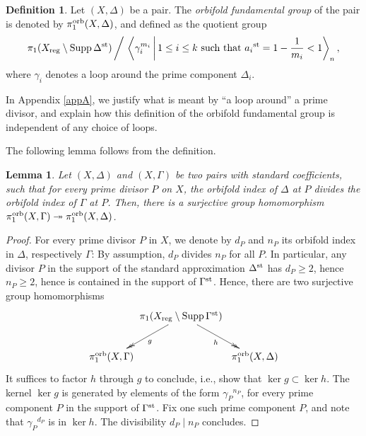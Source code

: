 \documentclass{amsart}
\newtheorem{lemma}[theorem]{Lemma}
\theoremstyle{definition}
\newtheorem{definition}[theorem]{Definition}
\theoremstyle{remark}
\numberwithin{equation}{section}
\begin{document}
\begin{definition}
Let $(X,\Delta)$ be a pair.
The {\em orbifold fundamental group} of the pair is denoted by $\pi_1^{\rm orb}(X,\Delta)$, and defined as the quotient group
\[
\pi_1(X_{\rm reg}\setminus {\rm Supp}\,\Delta^{\rm st})\,\biggr/\,\left\langle \gamma_i^{m_i} \,\biggr\vert\, 1\le i\le k \mbox{ such that } {a_i}^{\rm st} = 1-\frac{1}{m_i} < 1\right\rangle_n, 
\]
where $\gamma_i$ denotes a loop around the prime component $\Delta_i$.
\end{definition}

In Appendix \ref{appA}, we justify what is meant by ``a loop around'' a prime divisor, and explain how this definition of the orbifold fundamental group is independent of any choice of loops.


The following lemma follows from the definition.

\begin{lemma}\label{lem:fun-group-increasing-coeff}
Let $(X,\Delta)$ and $(X,\Gamma)$ be two pairs with standard coefficients, such that
for every prime divisor $P$ on $X$, the orbifold index of $\Delta$ at $P$
divides the orbifold index of $\Gamma$ at $P$.
Then, there is a surjective group homomorphism $\pi_1^{\rm orb}(X,\Gamma)\twoheadrightarrow \pi_1^{\rm orb}(X,\Delta)$.
\end{lemma}

\begin{proof}
For every prime divisor $P$ in $X$, we denote by $d_P$ and $n_P$ its orbifold index in $\Delta$, respectively $\Gamma$: By assumption, $d_P$ divides $n_P$ for all $P$. In particular, any divisor $P$ in the support of the standard approximation $\Delta^{\rm st}$ has $d_P \ge 2$, hence $n_P\ge 2$, hence is contained in the support of $\Gamma^{\rm st}$.
Hence, there are two surjective group homomorphisms
\[\xymatrixcolsep{0mm}
\xymatrix{
& \pi_1(X_{\rm reg}\setminus {\rm Supp}\,\Gamma^{\rm st}) \ar@{->>}[ld]^{g} \ar@{->>}[rd]_{h}\ &\\
\pi_1^{\rm orb}(X,\Gamma) & & \pi_1^{\rm orb}(X,\Delta)\\
}\]
It suffices to factor $h$ through $g$ to conclude, i.e., show that $\ker g\subset \ker h$. The kernel $\ker g$ is generated by elements of the form ${\gamma_P}^{n_P}$, for every prime component $P$ in the support of $\Gamma^{\rm st}$. Fix one such prime component $P$, and note that ${\gamma_P}^{d_P}$ is in $\ker h$. The divisibility $d_P\mid n_P$ concludes.
\end{proof}
\end{document}
